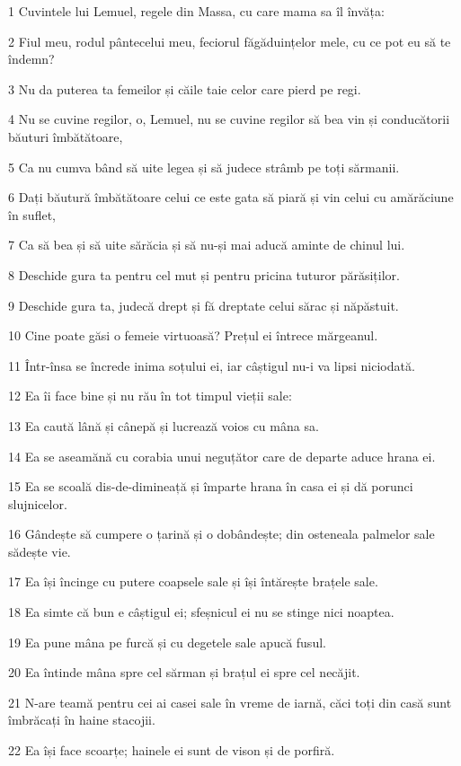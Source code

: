 \par 1 Cuvintele lui Lemuel, regele din Massa, cu care mama sa îl învăța:
\par 2 Fiul meu, rodul pântecelui meu, feciorul făgăduințelor mele, cu ce pot eu să te îndemn?
\par 3 Nu da puterea ta femeilor și căile taie celor care pierd pe regi.
\par 4 Nu se cuvine regilor, o, Lemuel, nu se cuvine regilor să bea vin și conducătorii băuturi îmbătătoare,
\par 5 Ca nu cumva bând să uite legea și să judece strâmb pe toți sărmanii.
\par 6 Dați băutură îmbătătoare celui ce este gata să piară și vin celui cu amărăciune în suflet,
\par 7 Ca să bea și să uite sărăcia și să nu-și mai aducă aminte de chinul lui.
\par 8 Deschide gura ta pentru cel mut și pentru pricina tuturor părăsiților.
\par 9 Deschide gura ta, judecă drept și fă dreptate celui sărac și năpăstuit.
\par 10 Cine poate găsi o femeie virtuoasă? Prețul ei întrece mărgeanul.
\par 11 Într-însa se încrede inima soțului ei, iar câștigul nu-i va lipsi niciodată.
\par 12 Ea îi face bine și nu rău în tot timpul vieții sale:
\par 13 Ea caută lână și cânepă și lucrează voios cu mâna sa.
\par 14 Ea se aseamănă cu corabia unui neguțător care de departe aduce hrana ei.
\par 15 Ea se scoală dis-de-dimineață și împarte hrana în casa ei și dă porunci slujnicelor.
\par 16 Gândește să cumpere o țarină și o dobândește; din osteneala palmelor sale sădește vie.
\par 17 Ea își încinge cu putere coapsele sale și își întărește brațele sale.
\par 18 Ea simte că bun e câștigul ei; sfeșnicul ei nu se stinge nici noaptea.
\par 19 Ea pune mâna pe furcă și cu degetele sale apucă fusul.
\par 20 Ea întinde mâna spre cel sărman și brațul ei spre cel necăjit.
\par 21 N-are teamă pentru cei ai casei sale în vreme de iarnă, căci toți din casă sunt îmbrăcați în haine stacojii.
\par 22 Ea își face scoarțe; hainele ei sunt de vison și de porfiră.

